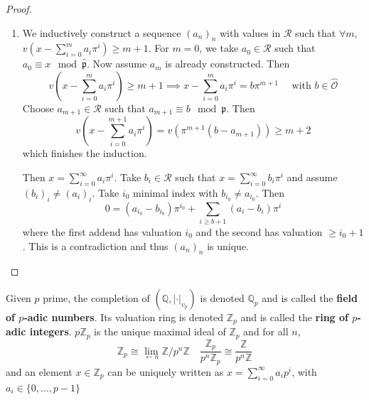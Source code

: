 \begin{proof}{}
\begin{enumerate}[label = \arabic*.]
    \item We inductively construct a sequence \({(a_{n})}_n\) with values in
        \(\mathcal{R}\) such that \(\forall m\), \(v{\left( x -
        \sum_{i=0}^{m} a_{i} \pi^{i}  \right)} \ge  m+1\). For \(m=0\), we
        take \(a_{0} \in \mathcal{R}\) such that \(a_{0} \equiv x \mod
        \widehat{\mathfrak{p}}\). Now assume \(a_{m}\) is already constructed.
        Then
        \[
          v {\left( x - \sum_{i=0}^{m} a_{i} \pi^{i}  \right)} \ge m+1 \implies
          x - \sum_{i=0}^{m} a_{i} \pi^{i} = b \pi^{m+1} \quad \text{ with } b
          \in \widehat{\mathcal{O}}
        \]
        Choose \(a_{m+1} \in \mathcal{R}\) such that \(a_{m+1} \equiv b \mod
        \mathfrak{p}\). Then
        \[
          v {\left( x - \sum_{i=0}^{m+1} a_{i} \pi^{i}  \right)} = v {\left(
          \pi^{m+1} {(b - a_{m+1} )} \right)} \ge m+2
        \]
        which finishes the induction.

        Then \(x = \sum_{i=0}^{\infty} a_{i} \pi^{i}\). Take \(b_{i} \in
        \mathcal{R}\) such that \(x = \sum_{i=0}^{\infty} b_{i} \pi^{i} \) and
        assume \({(b_{i})}_i \neq {(a_{i})}_i\).
        Take \(i_{0}\) minimal index with \(b_{i_{0}} \neq a_{i_{0}} \). Then
        \[
          0 = {(a_{i_{0}} - b_{i_{0}} )} \pi^{i_{0}} + \sum_{i \ge b+1}
          {(a_{i} - b_{i} )} \pi^{i}
        \]
        where the first addend has valuation \(i_{0}\) and the second has
        valuation \(\ge i_{0} + 1\). This is a contradiction and thus
        \({(a_{n})}_n\) is unique.
\end{enumerate}

\end{proof}

\begin{definition}{}
    Given \(p\) prime, the completion of \({(\mathbb{Q}, |\cdot |_{v_p} )}\) is
    denoted \(\mathbb{Q}_p\) and is called the \textbf{field of \(p\)-adic
    numbers}. Its valuation ring is denoted \(\mathbb{Z}_p\) and is called the
    \textbf{ring of \(p\)-adic integers}. \(p \mathbb{Z}_p\) is the unique
    maximal ideal of \(\mathbb{Z}_p\) and for all \(n\),
    \[
      \mathbb{Z}_p \cong  \lim_{\longleftarrow n} \mathbb{Z} / p^{n} \mathbb{Z}  \quad \frac{\mathbb{Z}_p}{p^{n}\mathbb{Z}_p} \cong \frac{\mathbb{Z}}{p^{n}\mathbb{Z}} 
    \]
    and an element \(x \in \mathbb{Z}_p\) can be uniquely written as \(x =
    \sum_{i=0}^{\infty} a_{i} p^{i} \), with \(a_{i} \in  \{0, \dots, p-1\} \) 
\end{definition}

